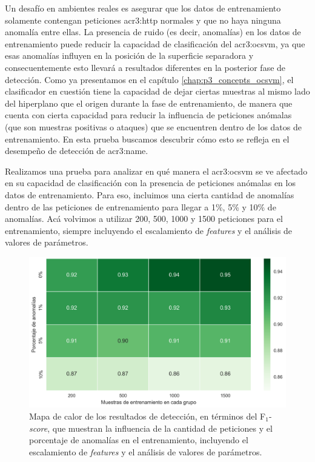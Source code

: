 Un desafío en ambientes reales es asegurar que los datos de entrenamiento
solamente contengan peticiones \gls{acr3:http} normales y que no haya
ninguna anomalía entre ellas. La presencia de ruido (es decir, anomalías)
en los datos de entrenamiento puede reducir la capacidad de clasificación
del \gls{acr3:ocsvm}, ya que esas anomalías influyen en la posición de
la superficie separadora y consecuentemente esto llevará a resultados
diferentes en la posterior fase de detección.
Como ya presentamos en el capítulo \autoref{chap:p3_concepts_ocsvm}, el
clasificador en cuestión tiene la capacidad de dejar ciertas muestras al
mismo lado del hiperplano que el origen durante la fase de entrenamiento,
de manera que cuenta con cierta capacidad para reducir la influencia de
peticiones anómalas (que son muestras positivas o ataques) que se encuentren
dentro de los datos de entrenamiento. En esta prueba buscamos descubrir
cómo esto se refleja en el desempeño de detección de \gls{acr3:name}.

Realizamos una prueba para analizar en qué manera el \gls{acr3:ocsvm}
se ve afectado en su capacidad de clasificación con la presencia de
peticiones anómalas en los datos de entrenamiento. Para eso, incluimos
una cierta cantidad de anomalías dentro de las peticiones de entrenamiento
para llegar a 1\%, 5\% y 10\% de anomalías. Acá volvimos a utilizar 200,
500, \num{1000} y \num{1500} peticiones para el entrenamiento, siempre
incluyendo el escalamiento de \textit{features} y el análisis de valores
de parámetros.

\begin{figure}[ht]
    \centering
    \includegraphics[width=\linewidth]{images/results-training-anomalies.png}

    \caption{Mapa de calor de los resultados de detección, en términos
        del F$_{1}$-\textit{score}, que muestran la influencia de la
        cantidad de peticiones y el porcentaje de anomalías en el
        entrenamiento, incluyendo el escalamiento de \textit{features}
        y el análisis de valores de parámetros.}
    \label{fig:res:results_training_anomalies}
\end{figure}

